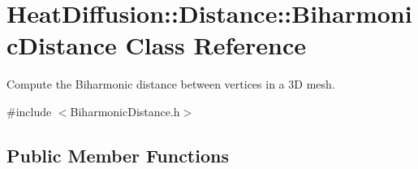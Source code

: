 \hypertarget{classHeatDiffusion_1_1Distance_1_1BiharmonicDistance}{\section{Heat\-Diffusion\-:\-:Distance\-:\-:Biharmonic\-Distance Class Reference}
\label{classHeatDiffusion_1_1Distance_1_1BiharmonicDistance}
}


Compute the Biharmonic distance between vertices in a 3\-D mesh.  




{\ttfamily \#include $<$Biharmonic\-Distance.\-h$>$}

\subsection*{Public Member Functions}
